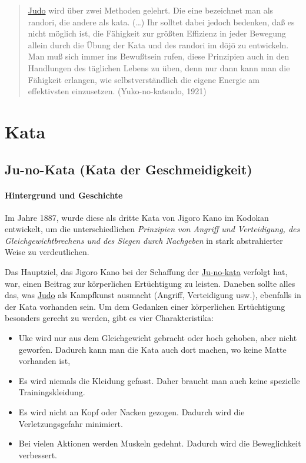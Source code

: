 \documentclass[justified, a4paper, notitlepage, captions=tableheading, nobib]{tufte-handout}
\begin{document}
\begin{quote}
\hyperref[org39a3ee2]{Judo} wird über zwei Methoden gelehrt. Die eine bezeichnet man als randori, die andere als kata. (\ldots{}) Ihr solltet dabei jedoch bedenken, daß es nicht möglich ist, die Fähigkeit zur größten Effizienz in jeder Bewegung allein durch die Übung der Kata und des randori im dōjō zu entwickeln. Man muß sich immer ins Bewußtsein rufen, diese Prinzipien auch in den Handlungen des täglichen Lebens zu üben, denn nur dann kann man die Fähigkeit erlangen, wie selbstverständlich die eigene Energie am effektivsten einzusetzen. (Yuko-no-katsudo, 1921) 
\end{quote}


\newpage
\section{Kata }
\label{sec:org8b44cea}
\subsection{\label{org4191c24}Ju-no-Kata (Kata der Geschmeidigkeit)}
\label{sec:orgf53c89b}
\paragraph{Hintergrund und Geschichte}
\label{sec:orgf7417dd}
Im Jahre 1887, wurde diese als dritte Kata von Jigoro Kano im Kodokan entwickelt, um die unterschiedlichen \emph{Prinzipien von Angriff und Verteidigung, des Gleichgewichtbrechens und des Siegen durch Nachgeben} in stark abstrahierter Weise zu verdeutlichen. 

Das Hauptziel, das Jigoro Kano bei der Schaffung der \hyperref[org4191c24]{Ju-no-kata} verfolgt hat, war, einen Beitrag zur körperlichen Ertüchtigung zu leisten. 
Daneben sollte alles das, was \hyperref[org39a3ee2]{Judo} als Kampfkunst ausmacht (Angriff, Verteidigung usw.), ebenfalls in der Kata vorhanden sein. 
Um dem Gedanken einer körperlichen Ertüchtigung besonders gerecht zu werden, gibt es vier Charakteristika:

\begin{itemize}
\item Uke wird nur aus dem Gleichgewicht gebracht oder hoch gehoben, aber nicht geworfen. Dadurch kann man die Kata auch dort machen, wo keine Matte vorhanden ist,
\item Es wird niemals die Kleidung gefasst. Daher braucht man auch keine spezielle Trainingskleidung.
\item Es wird nicht an Kopf oder Nacken gezogen. Dadurch wird die Verletzungsgefahr minimiert.
\item Bei vielen Aktionen werden Muskeln gedehnt. Dadurch wird die Beweglichkeit verbessert.
\end{itemize}
\end{document}
